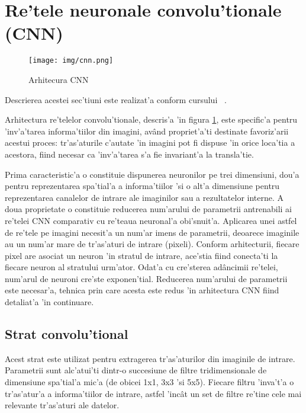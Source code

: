 \documentclass[12pt,a4paper,twoside]{report}
\begin{document}
\section{Re'tele neuronale convolu'tionale (CNN)}
\begin{figure}[H]
  \texttt{[image: img/cnn.png]}
  \centering
  \caption{Arhitecura CNN \protect\footnotemark}
  \label{fig:cnn}
\end{figure}

Descrierea acestei sec'tiuni este realizat'a conform cursului ~\cite{cnn}.

Arhitectura re'telelor convolu'tionale, descris'a 'in figura \ref{fig:cnn}, este specific'a pentru 'inv'a'tarea informa'tiilor din imagini, av\^and propriet'a'ti destinate favoriz'arii acestui proces: tr'as'aturile c'autate 'in imagini pot fi dispuse 'in orice loca'tia a acestora, fiind necesar ca 'inv'a'tarea s'a fie invariant'a la transla'tie. 

Prima caracteristic'a o constituie dispunerea neuronilor pe trei dimensiuni, dou'a pentru reprezentarea spa'tial'a a informa'tiilor 'si o alt'a dimensiune pentru reprezentarea canalelor de intrare ale imaginilor sau a rezultatelor interne. A doua proprietate o constituie reducerea num'arului de parametrii antrenabili ai re'telei CNN comparativ cu re'teaua neuronal'a obi'snuit'a. Aplicarea unei astfel de re'tele pe imagini necesit'a un num'ar imens de parametrii, deoarece imaginile au un num'ar mare de tr'as'aturi de intrare (pixeli). Conform arhitecturii, fiecare pixel are asociat un neuron 'in stratul de intrare, ace'stia fiind conecta'ti la fiecare neuron al stratului urm'ator. Odat'a cu cre'sterea ad\^ancimii re'telei, num'arul de neuroni cre'ste exponen'tial. Reducerea num'arului de parametrii este necesar'a, tehnica prin care acesta este redus 'in arhitectura CNN fiind detaliat'a 'in continuare.

\subsection{Strat convolu'tional}
Acest strat este utilizat pentru extragerea tr'as'aturilor din imaginile de intrare. Parametrii sunt alc'atui'ti dintr-o succesiune de filtre tridimensionale de dimensiune spa'tial'a mic'a (de obicei 1x1, 3x3 'si 5x5). Fiecare filtru 'inva't'a o tr'as'atur'a a informa'tiilor de intrare, astfel 'inc\^at un set de filtre re'tine cele mai relevante tr'as'aturi ale datelor.
\end{document}
